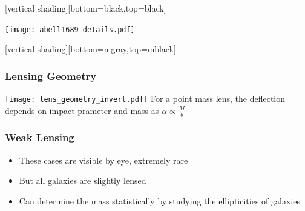 \documentclass{beamer}
\begin{document}
{
    [vertical shading][bottom=black,top=black]

    \frame
    {
        \begin{center}
            \texttt{[image: abell1689-details.pdf]}
        \end{center}
    }

    [vertical shading][bottom=mgray,top=mblack]

}


\frame
{
    \frametitle{Lensing Geometry}

    \begin{center}
        \texttt{[image: lens\_geometry\_invert.pdf]}
        \newline
        For a point mass lens, the deflection depends on impact
        prameter and mass as
        \newline
        {\huge {\color{gold} $\alpha \propto \frac{M}{b}$ }}
    \end{center}
}

\frame
{
    \frametitle{Weak Lensing}

 
    \begin{itemize}

        \item These cases are visible by eye, extremely rare

        \item But all galaxies are slightly lensed

        \item Can determine the mass statistically by studying
            the ellipticities of galaxies


    \end{itemize}

}
\end{document}
